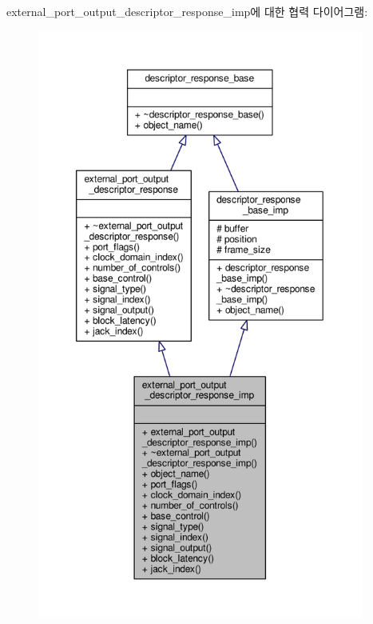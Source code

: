 external\+\_\+port\+\_\+output\+\_\+descriptor\+\_\+response\+\_\+imp에 대한 협력 다이어그램\+:
\nopagebreak
\begin{figure}[H]
\begin{center}
\leavevmode
\includegraphics[height=550pt]{classavdecc__lib_1_1external__port__output__descriptor__response__imp__coll__graph}
\end{center}
\end{figure}
